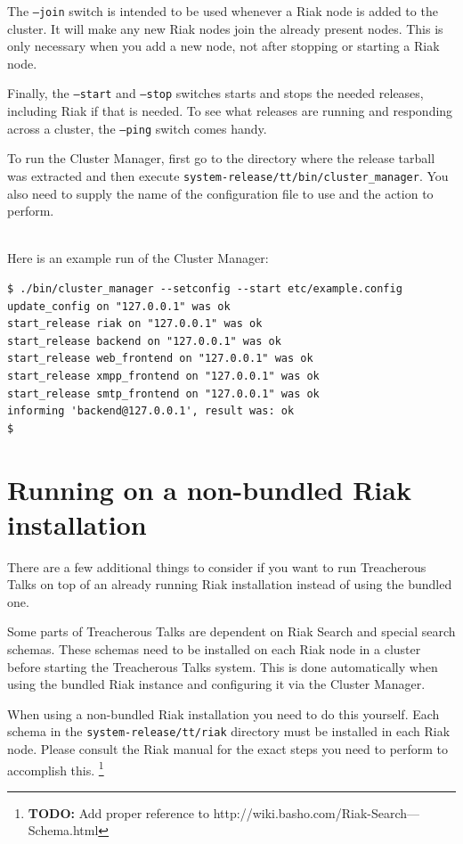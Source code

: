 \documentclass[11pt,a4paper]{report}
\newcommand{\todo}[1]{\footnote{{\color{red} {\bf TODO:} #1}}}
\begin{document}
The {\tt --join} switch is intended to be used whenever a Riak node is added to
the cluster. It will make any new Riak nodes join the already present
nodes. This is only necessary when you add a new node, not after stopping or
starting a Riak node.

Finally, the {\tt --start} and {\tt --stop} switches starts and stops the needed
releases, including Riak if that is needed. To see what releases are running and
responding across a cluster, the {\tt--ping} switch comes handy.

\begin{sloppypar}
To run the Cluster Manager, first go to the directory where the release tarball
was extracted and then execute {\tt system-release/tt/bin/cluster\_manager}. You
also need to supply the name of the configuration file to use and the action to
perform.
\end{sloppypar}
\mbox{}\\
Here is an example run of the Cluster Manager:
\begin{verbatim}
$ ./bin/cluster_manager --setconfig --start etc/example.config
update_config on "127.0.0.1" was ok
start_release riak on "127.0.0.1" was ok
start_release backend on "127.0.0.1" was ok
start_release web_frontend on "127.0.0.1" was ok
start_release xmpp_frontend on "127.0.0.1" was ok
start_release smtp_frontend on "127.0.0.1" was ok
informing 'backend@127.0.0.1', result was: ok
$
\end{verbatim}
\section{Running on a non-bundled Riak installation}
There are a few additional things to consider if you want to run Treacherous
Talks on top of an already running Riak installation instead of using the
bundled one.

Some parts of Treacherous Talks are dependent on Riak Search and special search
schemas. These schemas need to be installed on each Riak node in a cluster
before starting the Treacherous Talks system. This is done automatically when
using the bundled Riak instance and configuring it via the Cluster Manager.

When using a non-bundled Riak installation you need to do this yourself. Each
schema in the {\tt system-release/tt/riak} directory must be installed in each
Riak node. Please consult the Riak manual for the exact steps you need to
perform to accomplish this.
\todo{Add proper reference to http://wiki.basho.com/Riak-Search---Schema.html}
\end{document}
